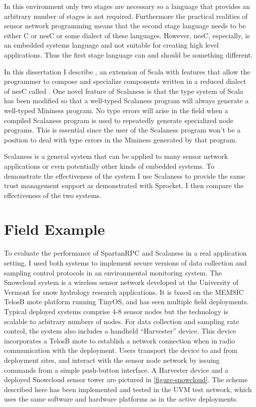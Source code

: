 
In this environment only two stages are necessary so a language that provides an arbitrary
number of stages is not required. Furthermore the practical realities of sensor network
programming means that the second stage language needs to be either C or nesC or some dialect of
these languages. However, nesC, especially, is an embedded systems language and not suitable for
creating high level applications. Thus the first stage language can and should be something
different.

In this dissertation I describe , an extension of Scala \cite{PiS2} with
features that allow the programmer to compose and specialize components written in a reduced
dialect of nesC called . One novel feature of Scalaness is that the type
system of Scala has been modified so that a well-typed Scalaness program will always generate a
well-typed Mininess program. No type errors will arise in the field when a compiled Scalaness
program is used to repeatedly generate specialized node programs. This is essential since the
user of the Scalaness program won't be a position to deal with type errors in the Mininess
generated by that program.

Scalaness is a general system that can be applied to many sensor network applications or even
potentially other kinds of embedded systems. To demonstrate the effectiveness of the system I
use Scalaness to provide the same trust management support as demonstrated with Sprocket. I then
compare the effectiveness of the two systems.

\section{Field Example}

To evaluate the performance of SpartanRPC and Scalaness in a real application setting, I used
both systems to implement secure versions of data collection and sampling control protocols in
an environmental monitoring system. The Snowcloud system
\cite{frolik-skalka-snowcloudtr,moeser-walker-skalka-frolik-wsc11} is a wireless sensor network
developed at the University of Vermont for snow hydrology research applications. It is based on
the MEMSIC TelosB mote platform running TinyOS, and has seen multiple field deployments. Typical
deployed systems comprise 4-8 sensor nodes but the technology is scalable to arbitrary numbers
of nodes. For data collection and sampling rate control, the system also includes a handheld
``Harvester'' device. This device incorporates a TelosB mote to establish a network connection
when in radio communication with the deployment. Users transport the device to and from
deployment sites, and interact with the sensor node network by issuing commands from a simple
push-button interface. A Harvester device and a deployed Snowcloud sensor tower are pictured in
\autoref{figure-snowcloud}. The scheme described here has been implemented and tested in the UVM
test network, which uses the same software and hardware platforms as in the active deployments.

